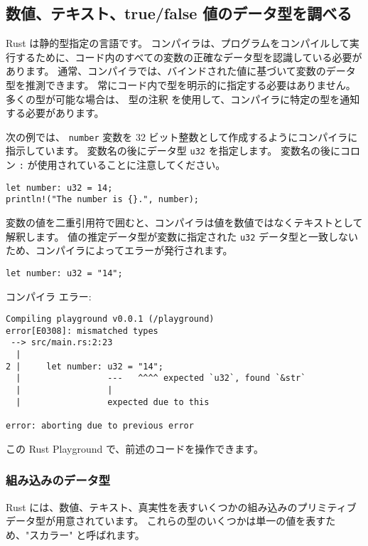 \subsection{数値、テキスト、true/false 値のデータ型を調べる}

Rust は静的型指定の言語です。 コンパイラは、プログラムをコンパイルして実行するために、コード内のすべての変数の正確なデータ型を認識している必要があります。 通常、コンパイラでは、バインドされた値に基づいて変数のデータ型を推測できます。 常にコード内で型を明示的に指定する必要はありません。 多くの型が可能な場合は、 型の注釈 を使用して、コンパイラに特定の型を通知する必要があります。

次の例では、 \texttt{number} 変数を 32 ビット整数として作成するようにコンパイラに指示しています。 変数名の後にデータ型 \texttt{u32} を指定します。 変数名の後にコロン \texttt{:} が使用されていることに注意してください。


\begin{lstlisting}[numbers=none]
let number: u32 = 14;
println!("The number is {}.", number);
\end{lstlisting}

変数の値を二重引用符で囲むと、コンパイラは値を数値ではなくテキストとして解釈します。 値の推定データ型が変数に指定された \texttt{u32} データ型と一致しないため、コンパイラによってエラーが発行されます。

\begin{lstlisting}[numbers=none]
let number: u32 = "14";
\end{lstlisting}

コンパイラ エラー:

\begin{lstlisting}[numbers=none]
   Compiling playground v0.0.1 (/playground)
error[E0308]: mismatched types
 --> src/main.rs:2:23
  |
2 |     let number: u32 = "14";
  |                 ---   ^^^^ expected `u32`, found `&str`
  |                 |
  |                 expected due to this

error: aborting due to previous error
\end{lstlisting}

この Rust Playground で、前述のコードを操作できます。

\subsubsection{組み込みのデータ型}

Rust には、数値、テキスト、真実性を表すいくつかの組み込みのプリミティブ データ型が用意されています。 これらの型のいくつかは単一の値を表すため、"スカラー" と呼ばれます。

